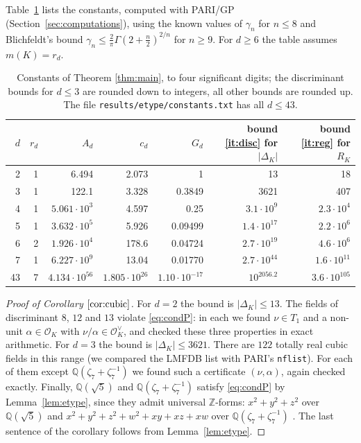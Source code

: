\documentclass[11pt]{amsart}
\theoremstyle{definition}
\numberwithin{equation}{section}
\newcommand{\OK}{\mathcal{O}_K}
\newcommand{\OKd}{\mathcal{O}_K^{\vee}}
\newcommand{\Q}{\mathbb{Q}}
\newcommand{\Z}{\mathbb{Z}}
\newcommand{\file}[1]{\texttt{#1}}
\begin{document}
\medskip
Table~\ref{tab:bounds} lists the constants, computed with PARI/GP (Section~\ref{sec:computations}),
using the known values of $\gamma_n$ for $n\le8$ \cite{CS} and Blichfeldt's bound
$\gamma_n\le\frac2\pi\Gamma(2+\frac n2)^{2/n}$ \cite{Bl} for $n\ge9$.  For $d\ge6$ the table assumes
$m(K)=r_d$.

\begin{table}[ht]
\centering
\begin{tabular}{rrrrrrr}
\toprule
$d$ & $r_d$ & $A_d$ & $c_d$ & $G_d$ & bound \ref{it:disc} for $|\Delta_K|$ & bound \ref{it:reg} for $R_K$ \\
\midrule
2 & 1 & 6.494 & 2.073 & 1 & 13 & 18 \\
3 & 1 & 122.1 & 3.328 & 0.3849 & 3621 & 407 \\
4 & 1 & $5.061\cdot10^{3}$ & 4.597 & 0.25 & $3.1\cdot10^{9}$ & $2.3\cdot10^{4}$ \\
5 & 1 & $3.632\cdot10^{5}$ & 5.926 & 0.09499 & $1.4\cdot10^{17}$ & $2.2\cdot10^{6}$ \\
6 & 2 & $1.926\cdot10^{4}$ & 178.6 & 0.04724 & $2.7\cdot10^{19}$ & $4.6\cdot10^{6}$ \\
7 & 1 & $6.227\cdot10^{9}$ & 13.04 & 0.01770 & $2.7\cdot10^{44}$ & $1.6\cdot10^{11}$ \\
43 & 7 & $4.134\cdot10^{56}$ & $1.805\cdot10^{26}$ & $1.10\cdot10^{-17}$ & $10^{2056.2}$ & $3.6\cdot10^{105}$ \\
\bottomrule
\end{tabular}
\caption{Constants of Theorem \ref{thm:main}, to four significant digits; the discriminant bounds for
$d\le3$ are rounded down to integers, all other bounds are rounded up.
The file \file{results/etype/constants.txt} has all $d\le43$.}
\label{tab:bounds}
\end{table}

\begin{proof}[Proof of Corollary $\ref{cor:cubic}$]
For $d=2$ the bound is $|\Delta_K|\le13$.  The fields of discriminant $8$, $12$ and $13$ violate
\eqref{eq:condP}: in each we found $\nu\in T_1$ and a non-unit $\alpha\in\OK$ with
$\nu/\alpha\in\OKd$, and checked these three properties in exact arithmetic.  For $d=3$ the bound is
$|\Delta_K|\le3621$.  There are $122$ totally real cubic fields in this range (we compared the LMFDB
list \cite{LMFDB} with PARI's \file{nflist}).  For each of them except $\Q(\zeta_7+\zeta_7^{-1})$ we
found such a certificate $(\nu,\alpha)$, again checked exactly.  Finally, $\Q(\sqrt5)$ and
$\Q(\zeta_7+\zeta_7^{-1})$ satisfy \eqref{eq:condP} by Lemma~\ref{lem:etype}, since they admit
universal $\Z$-forms: $x^2+y^2+z^2$ over $\Q(\sqrt5)$ \cite{Ma} and $x^2+y^2+z^2+w^2+xy+xz+xw$ over
$\Q(\zeta_7+\zeta_7^{-1})$ \cite[Theorem~1.2]{KY1}.  The last sentence of the corollary follows from
Lemma~\ref{lem:etype}.
\end{proof}
\end{document}
